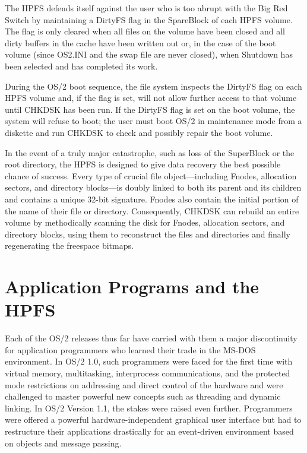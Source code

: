 The HPFS defends itself against the user who is too abrupt with the Big Red
Switch by maintaining a DirtyFS flag in the SpareBlock of each HPFS volume.
The flag is only cleared when all files on the volume have been closed and
all dirty buffers in the cache have been written out or, in the case of the
boot volume (since OS2.INI and the swap file are never closed), when Shutdown
has been selected and has completed its work.
 
During the OS/2 boot sequence, the file system inspects the DirtyFS flag on
each HPFS volume and, if the flag is set, will not allow further access to
that volume until CHKDSK has been run. If the DirtyFS flag is set on the boot
volume, the system will refuse to boot; the user must boot OS/2 in
maintenance mode from a diskette and run CHKDSK to check and possibly repair
the boot volume.
 
In the event of a truly major catastrophe, such as loss of the SuperBlock or
the root directory, the HPFS is designed to give data recovery the best
possible chance of success.  Every type of crucial file object---including
Fnodes, allocation sectors, and directory blocks---is doubly linked to both its
parent and its children and contains a unique 32-bit signature.  Fnodes also
contain the initial portion of the name of their file or directory.
Consequently, CHKDSK can rebuild an entire volume by methodically scanning
the disk for Fnodes, allocation sectors, and directory blocks, using them to
reconstruct the files and directories and finally regenerating the freespace
bitmaps.
 
\section{\heads Application Programs and the HPFS}
 
Each of the OS/2 releases thus far have carried with them a major
discontinuity for application programmers who learned their trade in the
MS-DOS environment.  In OS/2 1.0, such programmers were faced for the first
time with virtual memory, multitasking, interprocess communications, and the
protected mode restrictions on addressing and direct control of the hardware
and were challenged to master powerful new concepts such as threading and
dynamic linking. In OS/2 Version 1.1, the stakes were raised even further.
Programmers were offered a powerful hardware-independent graphical user
interface but had to restructure their applications drastically for an
event-driven environment based on objects and message passing.
 
